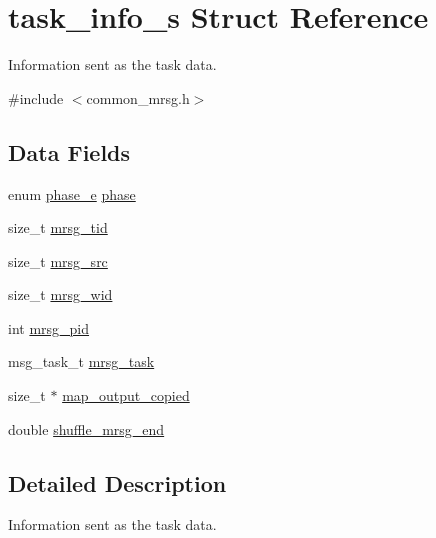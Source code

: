 \hypertarget{structtask__info__s}{\section{task\-\_\-info\-\_\-s \-Struct \-Reference}
\label{structtask__info__s}
}


\-Information sent as the task data.  




{\ttfamily \#include $<$common\-\_\-mrsg.\-h$>$}

\subsection*{\-Data \-Fields}
\begin{DoxyCompactItemize}
\item 
enum \hyperlink{mrsg_8h_afa14b6e068c0e0b8557777e16f2582f2}{phase\-\_\-e} \hyperlink{structtask__info__s_afa72d514e04545e1916981f970178902}{phase}
\item 
size\-\_\-t \hyperlink{structtask__info__s_a19ae853b34711df40fa09b1eb44d2700}{mrsg\-\_\-tid}
\item 
size\-\_\-t \hyperlink{structtask__info__s_ad0992967bc61c85a49a410b3f9570bba}{mrsg\-\_\-src}
\item 
size\-\_\-t \hyperlink{structtask__info__s_a41aeccbfeb28856a0d06005d3335fe4f}{mrsg\-\_\-wid}
\item 
int \hyperlink{structtask__info__s_a9ec7e46e1f90db29b69480e8b9485218}{mrsg\-\_\-pid}
\item 
msg\-\_\-task\-\_\-t \hyperlink{structtask__info__s_aa48722944c2a15652f194ef48bd5adf3}{mrsg\-\_\-task}
\item 
size\-\_\-t $\ast$ \hyperlink{structtask__info__s_a89d391613219da550d84283a89461bf4}{map\-\_\-output\-\_\-copied}
\item 
double \hyperlink{structtask__info__s_aff9b2235fc4e0e475193c0c21cb78866}{shuffle\-\_\-mrsg\-\_\-end}
\end{DoxyCompactItemize}


\subsection{\-Detailed \-Description}
\-Information sent as the task data. 

